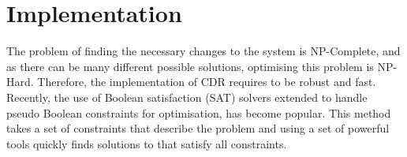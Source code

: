 \chapter{Implementation}
\label{implementation}
The problem of finding the necessary changes to the system is NP-Complete, and as there can be many different possible solutions, optimising this problem is NP-Hard.
Therefore, the implementation of CDR requires to be robust and fast.
Recently, the use of Boolean satisfaction (SAT) solvers extended to handle pseudo Boolean constraints for optimisation, has become popular.
This method takes a set of constraints that describe the problem and using a set of powerful tools quickly finds solutions to that satisfy all constraints.










